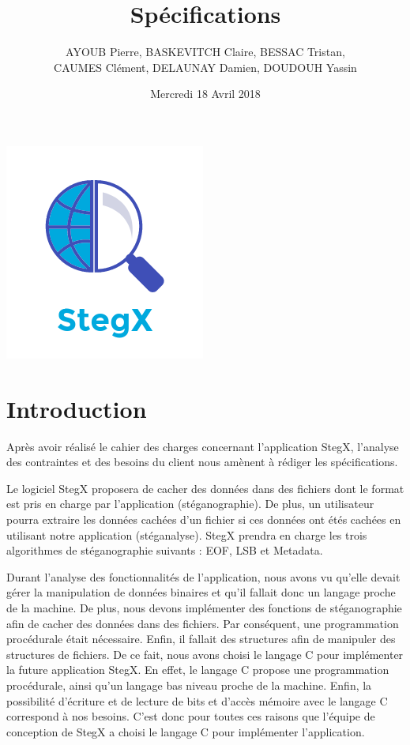 \documentclass[11pt]{article}
\title{\huge{\textbf Spécifications}}
\author{AYOUB Pierre, BASKEVITCH Claire, BESSAC Tristan, \\
CAUMES Clément, DELAUNAY Damien, DOUDOUH Yassin}
\date{Mercredi 18 Avril 2018}
\begin{document}
\maketitle
\vspace{20em}
\begin{center}\includegraphics{pictures/Application.png}\end{center}
\newpage

\tableofcontents

\newpage

\section{Introduction}

Après avoir réalisé le cahier des charges concernant l'application StegX, 
l'analyse des contraintes et des besoins du client nous amènent à rédiger 
les spécifications. 

Le logiciel StegX proposera de cacher des données dans des fichiers dont le
format est pris en charge par l'application (stéganographie). De plus, un
utilisateur pourra extraire les données cachées d'un fichier si ces données ont
étés cachées en utilisant notre application (stéganalyse). StegX prendra en
charge les trois algorithmes de stéganographie suivants : EOF, LSB et Metadata.

Durant l'analyse des fonctionnalités de l'application, nous avons vu qu'elle
devait gérer la manipulation de données binaires et qu’il fallait donc un
langage proche de la machine. De plus, nous devons implémenter des fonctions de
stéganographie afin de cacher des données dans des fichiers. Par conséquent, une
programmation procédurale était nécessaire. Enfin, il fallait des structures
afin de manipuler des structures de fichiers. De ce fait, nous avons choisi le
langage C pour implémenter la future application StegX. En effet, le langage C
propose une programmation procédurale, ainsi qu'un langage bas niveau proche de
la machine. Enfin, la possibilité d'écriture et de lecture de bits et d'accès
mémoire avec le langage C correspond à nos besoins. C'est donc pour toutes ces
raisons que l'équipe de conception de StegX a choisi le langage C pour
implémenter l'application. 
\end{document}
